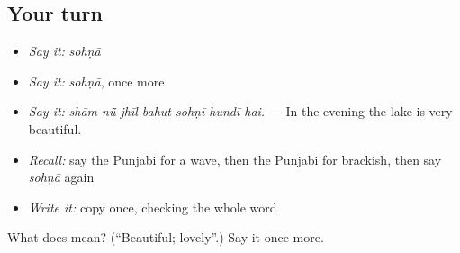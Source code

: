 \subsection*{Your turn}
\begin{itemize}
\raggedright
  \item \emph{Say it:} \emph{sohṇā}
  \item \emph{Say it:} \emph{sohṇā}, once more
  \item \emph{Say it:} \emph{shām nū̃ jhīl bahut sohṇī hundī hai.} — In the evening the lake is very beautiful.
  \item \emph{Recall:} say the Punjabi for a wave, then the Punjabi for brackish, then say \emph{sohṇā} again
  \item \emph{Write it:} copy \textbf{} once, checking the whole word
\end{itemize}

\begin{tcolorbox}[breakable,colback=teal!4,colframe=teal!35!black,title={Before you move on}]
What does  mean? (\textquotedblleft{}Beautiful; lovely\textquotedblright{}.) Say it once more.
\end{tcolorbox}
